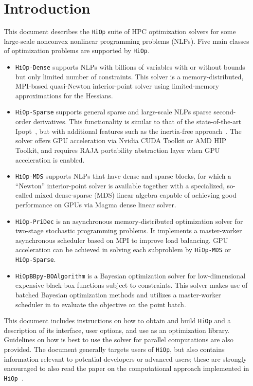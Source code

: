 \documentclass[11pt]{article}
\newcounter{line}
\newcommand{\Hi}{\texttt{HiOp}\xspace}
\begin{document}
\newpage

\tableofcontents

\newpage

\section{Introduction}

This document describes the \Hi suite of HPC optimization solvers for some large-scale nonconvex nonlinear programming problems (NLPs). Five main classes of optimization problems are supported by \Hi. 
\begin{itemize}
  \item \texttt{HiOp-Dense} supports NLPs with billions of variables with or without bounds but only limited number of
  constraints. This solver is a memory-distributed, MPI-based quasi-Newton interior-point solver using limited-memory approximations for the Hessians.
  \item \texttt{HiOp-Sparse} supports general sparse and large-scale NLPs sparse second-order derivatives. This functionality is similar to that of the state-of-the-art Ipopt~\cite{waecther_05_ipopt0}, but with additional features such as the inertia-free approach~\cite{Chiang2016}. The solver offers GPU acceleration via Nvidia CUDA Toolkit or AMD HIP Toolkit, and requires RAJA portability abstraction layer when GPU acceleration is enabled.
  \item \texttt{HiOp-MDS} supports NLPs that have dense and sparse blocks, for which a ``Newton'' interior-point solver is available together with a specialized, so-called mixed dense-sparse (MDS) linear algebra capable of achieving good performance on GPUs via Magma dense linear solver.
  \item \texttt{HiOp-PriDec} is an asynchronous memory-distributed optimization solver for two-stage stochastic programming problems. It implements a master-worker asynchronous scheduler based on MPI to improve load balancing. GPU acceleration can be achieved in solving each subproblem by \texttt{HiOp-MDS} or \texttt{HiOp-Sparse}.
  \item \texttt{HiOpBBpy-BOAlgorithm} is a Bayesian optimization solver for low-dimensional expensive black-box functions subject to constraints. This solver makes use of batched Bayesian optimization methods and utilizes a master-worker scheduler in to evaluate the objective on the point batch. 
\end{itemize}

This document includes instructions on how to obtain and
build \Hi and a description of its interface, user options, and use as an optimization library. Guidelines on how is best to use the solver for parallel computations are also provided. The document generally targets users of \Hi, but also contains information relevant to potential developers or advanced users; these are strongly encouraged to also read the paper on the computational approach implemented in \Hi~\cite{petra2019memory}.
\end{document}
